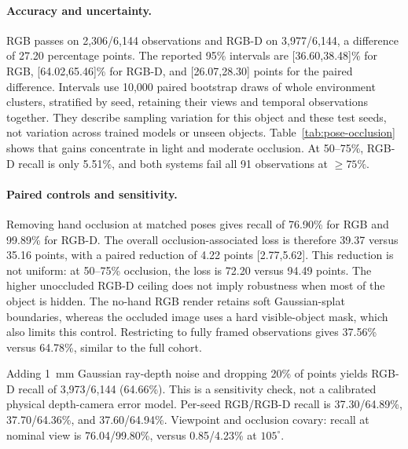 \paragraph{Accuracy and uncertainty.}
RGB passes on 2,306/6,144 observations and RGB-D on 3,977/6,144, a difference of 27.20 percentage points. The reported 95\% intervals are [36.60,38.48]\% for RGB, [64.02,65.46]\% for RGB-D, and [26.07,28.30] points for the paired difference. Intervals use 10,000 paired bootstrap draws of whole environment clusters, stratified by seed, retaining their views and temporal observations together. They describe sampling variation for this object and these test seeds, not variation across trained models or unseen objects. Table~\ref{tab:pose-occlusion} shows that gains concentrate in light and moderate occlusion. At 50--75\%, RGB-D recall is only 5.51\%, and both systems fail all 91 observations at $\geq75\%$.

\begin{table}[t]
\centering\small

\caption{Secondary pose metrics. All recall denominators include invalid predictions. $^{*}$Mean errors use valid predictions only and must be interpreted with the invalid counts. Threshold comparisons are strict.}
\label{tab:pose-metrics}
\end{table}

\paragraph{Paired controls and sensitivity.}
Removing hand occlusion at matched poses gives recall of 76.90\% for RGB and 99.89\% for RGB-D. The overall occlusion-associated loss is therefore 39.37 versus 35.16 points, with a paired reduction of 4.22 points [2.77,5.62]. This reduction is not uniform: at 50--75\% occlusion, the loss is 72.20 versus 94.49 points. The higher unoccluded RGB-D ceiling does not imply robustness when most of the object is hidden. The no-hand RGB render retains soft Gaussian-splat boundaries, whereas the occluded image uses a hard visible-object mask, which also limits this control. Restricting to fully framed observations gives 37.56\% versus 64.78\%, similar to the full cohort.

Adding 1~mm Gaussian ray-depth noise and dropping 20\% of points yields RGB-D recall of 3,973/6,144 (64.66\%). This is a sensitivity check, not a calibrated physical depth-camera error model. Per-seed RGB/RGB-D recall is 37.30/64.89\%, 37.70/64.36\%, and 37.60/64.94\%. Viewpoint and occlusion covary: recall at nominal view is 76.04/99.80\%, versus 0.85/4.23\% at $105^\circ$.

